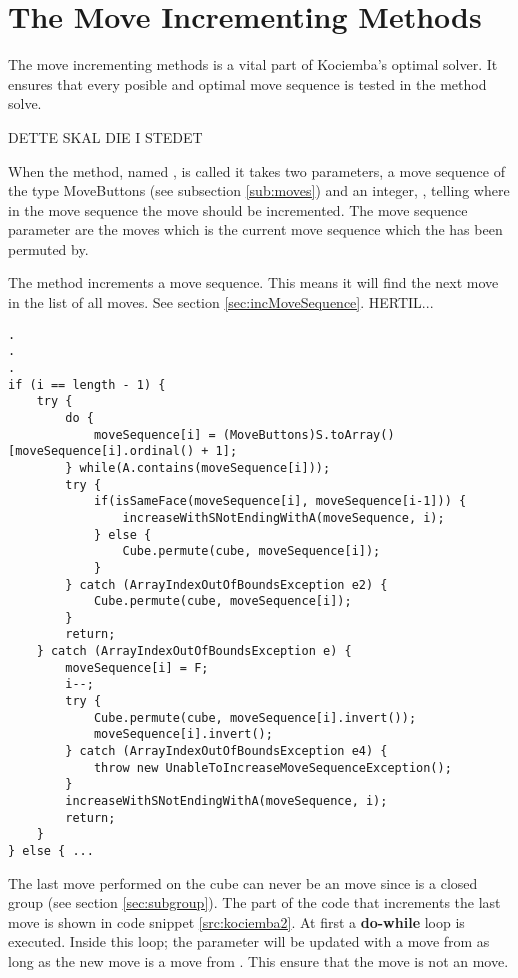 \section{The Move Incrementing Methods}
\label{sec:increaseWithSNotEndingWithA}
The move incrementing methods is a vital part of Kociemba's optimal solver. It ensures that every posible and optimal move sequence is tested in the method solve.

DETTE SKAL DIE I STEDET

When the method, named , is called it takes two parameters, a move sequence of the type MoveButtons (see subsection \ref{sub:moves}) and an integer, , telling where in the move sequence the move should be incremented. The move sequence parameter are the moves which is the current move sequence which the \cube{} has been permuted by.

The method increments a move sequence. This means it will find the next move in the list of all moves. See section \ref{sec:incMoveSequence}.
HERTIL...

\begin{lstlisting}[style=sourceCode, caption=\myCaption{Key point in the incrementing method of kociemba's optimal solver}, label=src:kociemba2]
.
.
.
if (i == length - 1) {
	try {
		do {
			moveSequence[i] = (MoveButtons)S.toArray()[moveSequence[i].ordinal() + 1];
		} while(A.contains(moveSequence[i]));
		try {
			if(isSameFace(moveSequence[i], moveSequence[i-1])) {
				increaseWithSNotEndingWithA(moveSequence, i);
			} else {
				Cube.permute(cube, moveSequence[i]);
			}
		} catch (ArrayIndexOutOfBoundsException e2) {
			Cube.permute(cube, moveSequence[i]);
		}
		return;
	} catch (ArrayIndexOutOfBoundsException e) {
		moveSequence[i] = F;
		i--;
		try {
			Cube.permute(cube, moveSequence[i].invert());
			moveSequence[i].invert();
		} catch (ArrayIndexOutOfBoundsException e4) {
			throw new UnableToIncreaseMoveSequenceException();
		}
		increaseWithSNotEndingWithA(moveSequence, i);
		return;
	}
} else { ...
\end{lstlisting}

The last move performed on the cube can never be an  move since  is a closed group (see section \ref{sec:subgroup}). The part of the code that increments the last move is shown in code snippet \ref{src:kociemba2}.
At first a \textbf{do-while} loop is executed. 
Inside this loop; the parameter  will be updated with a move from  as long as the new move is a move from . This ensure that the move is not an  move.

